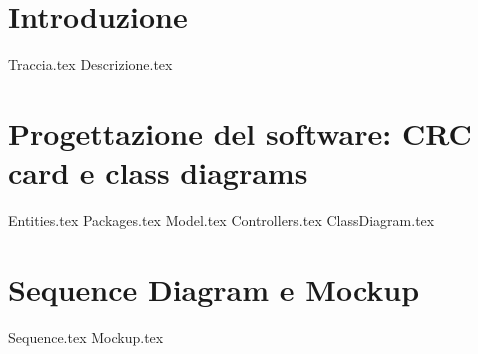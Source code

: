 \documentclass[a4paper, 10.5pt]{book}
\begin{document}
\chapter{Introduzione}
	{Traccia.tex}
	{Descrizione.tex}
\chapter{Progettazione del software: CRC card e class diagrams}
	{Entities.tex}
	{Packages.tex}
	{Model.tex}
	{Controllers.tex}
	{ClassDiagram.tex}
\chapter{Sequence Diagram e Mockup}
	{Sequence.tex}
	{Mockup.tex}
\end{document}
